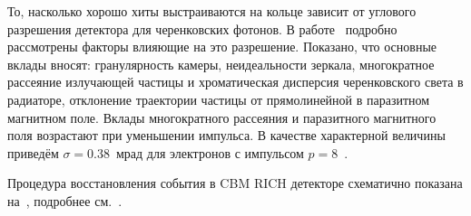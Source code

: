 То, насколько хорошо хиты выстраиваются на кольце зависит от углового разрешения детектора для черенковских фотонов. В работе~\cite{TDR_RICH, KOPFERDISS} подробно рассмотрены факторы влияющие на это разрешение. Показано, что основные вклады вносят: гранулярность камеры, неидеальности зеркала, многократное рассеяние излучающей частицы и хроматическая дисперсия черенковского света в радиаторе, отклонение траектории частицы от прямолинейной в паразитном магнитном поле.
Вклады многократного рассеяния и паразитного магнитного поля возрастают при уменьшении импульса. В качестве характерной величины приведём $\sigma = 0.38$~мрад для электронов с импульсом $p=8$~\GeVoverC{}.


\bigskip

Процедура восстановления события в CBM RICH детекторе схематично показана на~, подробнее см.~\cite{}.

